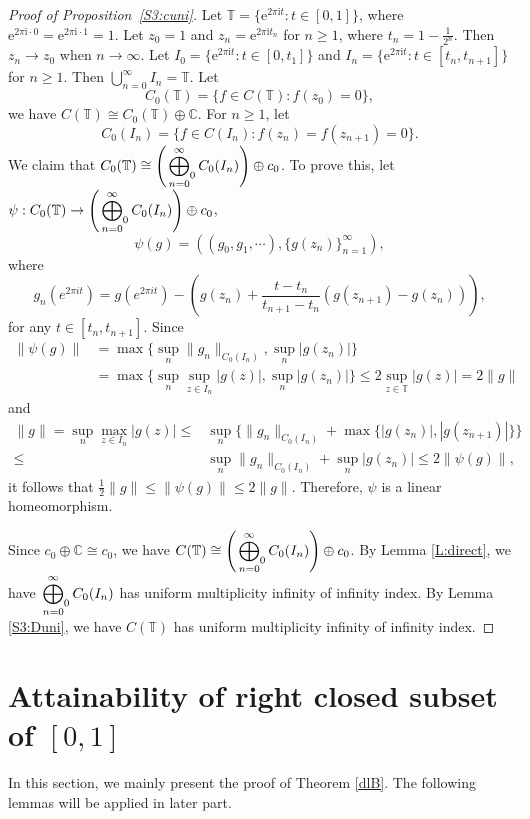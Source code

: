 \documentclass[12pt]{amsart}
\numberwithin{equation}{section}
\theoremstyle{plain}
\theoremstyle{definition}
\begin{document}
\begin{proof}[Proof of Proposition~\ref{S3:cuni}]
Let $\mathbb{T}=\{\mathrm{e}^{2\pi\mathrm{i}t}:t\in[0,1]\}$, where $\mathrm{e}^{2\pi\mathrm{i}\cdot0}=\mathrm{e}^{2\pi\mathrm{i}\cdot1}=1$.
Let $z_0=1$ and $z_n=\mathrm{e}^{2\pi\mathrm{i}t_n}$ for $n\geq 1$, where $t_n=1-\frac{1}{2^n}$.
Then $z_n\rightarrow z_0$ when $n\rightarrow \infty$.
Let $I_0=\{\mathrm{e}^{2\pi\mathrm{i}t}:t\in[0,t_1]\}$ and
$I_n=\{\mathrm{e}^{2\pi\mathrm{i}t}:t\in[t_n,t_{n+1}]\}$
for $n\geq 1$.
Then $\bigcup_{n=0}^{\infty}I_n=\mathbb{T}$.
Let
$$C_0(\mathbb{T})=\{f\in C(\mathbb{T}):f(z_0)=0\},$$ we have
$C(\mathbb{T})\cong C_0(\mathbb{T})\oplus \mathbb{C}$.
For $n\geq 1$,
let
$$C_{0}(I_n)=\{f\in C(I_n):f(z_n)=f(z_{n+1})=0\}.$$
We claim that $C_0(\mathbb{T})\cong \left(\sideset{}{_0}\bigoplus\limits_{n=0}^{\infty} C_0(I_n)\right)\oplus c_0$.
To prove this, let $\psi:C_0(\mathbb{T})\rightarrow \left(\sideset{}{_0}\bigoplus\limits_{n=0}^{\infty} C_0(I_n)\right)\oplus c_0$,
$$\psi(g)=\left((g_0,g_1,\cdots),\{g(z_n)\}_{n=1}^{\infty}\right),$$
where
$$g_n(e^{2\pi i t})=g(e^{2\pi i t})-\left(g(z_n)+\frac{t-t_n}{t_{n+1}-t_n}\left(g(z_{n+1})-g(z_n)\right)\right),$$
for any $t\in [t_n,t_{n+1}]$.
Since
\begin{align*}
\|\psi(g)\|&=\max\{\sup_n\|g_n\|_{C_0(I_n)},\sup_n|g(z_n)|\}\\
&=\max\{\sup_n\sup_{z\in I_n}|g(z)|,\sup_n|g(z_n)|\}\leq 2\sup_{z\in\mathbb{T}}|g(z)|=2\|g\|
\end{align*}
and
\begin{align*}
\|g\|=\sup_n\max_{z\in I_n}|g(z)|
\leq&\sup_n\{\|g_n\|_{C_0(I_n)}+\max\{|g(z_n)|,|g(z_{n+1})|\}\}\\
\leq&\sup_n \|g_n\|_{C_0(I_n)}+\sup_n|g(z_n)|\leq 2\|\psi(g)\|,
\end{align*}
it follows that
$\frac{1}{2}\|g\|\leq\|\psi(g)\|\leq 2\|g\|$.
Therefore, $\psi$ is a linear homeomorphism.

Since $c_0\oplus \mathbb{C} \cong c_0$, we have $C(\mathbb{T})\cong \left(\sideset{}{_0}\bigoplus\limits_{n=0}^{\infty} C_0(I_n)\right)\oplus c_0$.
By Lemma \ref{L:direct}, we have $\sideset{}{_0}\bigoplus\limits_{n=0}^{\infty} C_0(I_n)$ has uniform multiplicity infinity of infinity index.
By Lemma \ref{S3:Duni}, we have $C(\mathbb{T})$ has uniform multiplicity infinity of infinity index.
\end{proof}


\section{Attainability of right closed subset of $[0,1]$}
In this section, we mainly present the proof of Theorem \ref{dlB}.
The following lemmas will be applied in later part.
\end{document}
